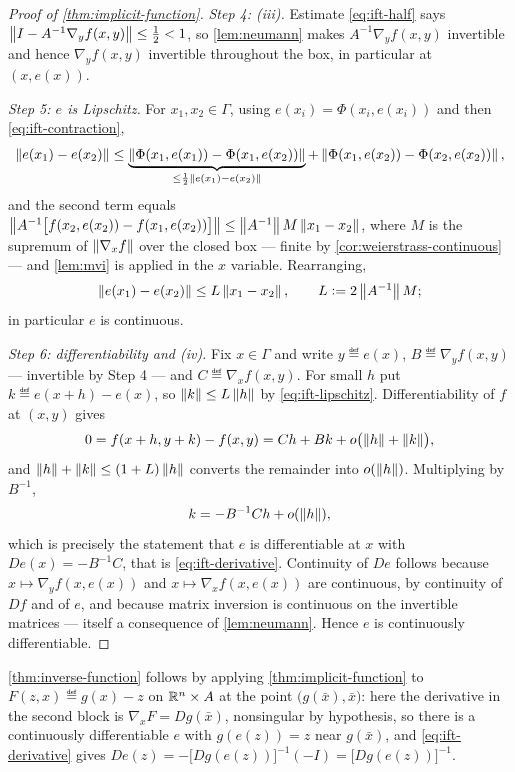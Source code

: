 \begin{proof}[Proof of \autoref{thm:implicit-function}]
	\emph{Step 4: (iii).} Estimate \eqref{eq:ift-half} says
	$\left\lVert I-A^{-1}\nabla_yf(x,y)\right\rVert\leq\tfrac12<1$, so \autoref{lem:neumann} makes
	$A^{-1}\nabla_yf(x,y)$ invertible and hence $\nabla_yf(x,y)$ invertible
	throughout the box, in particular at $(x,e(x))$.

	\emph{Step 5: $e$ is Lipschitz.} For $x_1,x_2\in\Gamma$, using
	$e(x_i)=\Phi(x_i,e(x_i))$ and then \eqref{eq:ift-contraction},
	\[
		\left\lVert e(x_1)-e(x_2)\right\rVert
		\leq\underbrace{\left\lVert\Phi(x_1,e(x_1))-\Phi(x_1,e(x_2))\right\rVert}
		_{\leq\frac12\left\lVert e(x_1)-e(x_2)\right\rVert}
		+\left\lVert\Phi(x_1,e(x_2))-\Phi(x_2,e(x_2))\right\rVert,
	\]
	and the second term equals
	$\left\lVert A^{-1}\bigl[f(x_2,e(x_2))-f(x_1,e(x_2))\bigr]\right\rVert
		\leq\left\lVert A^{-1}\right\rVert M\left\lVert x_1-x_2\right\rVert$, where $M$ is the supremum of
	$\left\lVert\nabla_xf\right\rVert$ over the closed box --- finite by
	\autoref{cor:weierstrass-continuous} --- and \autoref{lem:mvi} is applied in the
	$x$ variable. Rearranging,
	\begin{equation}\label{eq:ift-lipschitz}
		\left\lVert e(x_1)-e(x_2)\right\rVert\leq L\left\lVert x_1-x_2\right\rVert,\qquad L\mathrel{\vcentcolon=}2\left\lVert A^{-1}\right\rVert M ;
	\end{equation}
	in particular $e$ is continuous.

	\emph{Step 6: differentiability and (iv).} Fix $x\in\Gamma$ and write
	$y\eqdef e(x)$, $B\eqdef\nabla_yf(x,y)$ --- invertible by Step 4 --- and
	$C\eqdef\nabla_xf(x,y)$. For small $h$ put $k\eqdef e(x+h)-e(x)$, so
	$\left\lVert k\right\rVert\leq L\left\lVert h\right\rVert$ by \eqref{eq:ift-lipschitz}. Differentiability of $f$
	at $(x,y)$ gives
	\[
		0=f(x+h,y+k)-f(x,y)=Ch+Bk+o\bigl(\left\lVert h\right\rVert+\left\lVert k\right\rVert\bigr),
	\]
	and $\left\lVert h\right\rVert+\left\lVert k\right\rVert\leq(1+L)\left\lVert h\right\rVert$ converts the remainder into
	$o(\left\lVert h\right\rVert)$. Multiplying by $B^{-1}$,
	\[
		k=-B^{-1}Ch+o(\left\lVert h\right\rVert),
	\]
	which is precisely the statement that $e$ is differentiable at $x$ with
	$De(x)=-B^{-1}C$, that is \eqref{eq:ift-derivative}. Continuity of $De$ follows
	because $x\mapsto\nabla_yf(x,e(x))$ and $x\mapsto\nabla_xf(x,e(x))$ are
	continuous, by continuity of $Df$ and of $e$, and because matrix inversion is
	continuous on the invertible matrices --- itself a consequence of
	\autoref{lem:neumann}. Hence $e$ is continuously differentiable.
\end{proof}

\begin{remark}\label{rem:ift-implies-inverse}
	\autoref{thm:inverse-function} follows by applying
	\autoref{thm:implicit-function} to $F(z,x)\eqdef g(x)-z$ on
	$\mathbb{R}^{n}\times A$ at the point $\bigl(g(\bar x),\bar x\bigr)$: here the
	derivative in the second block is $\nabla_xF=Dg(\bar x)$, nonsingular by
	hypothesis, so there is a continuously differentiable $e$ with $g(e(z))=z$ near
	$g(\bar x)$, and \eqref{eq:ift-derivative} gives
	$De(z)=-\bigl[Dg(e(z))\bigr]^{-1}(-I)=\bigl[Dg(e(z))\bigr]^{-1}$.
\end{remark}

